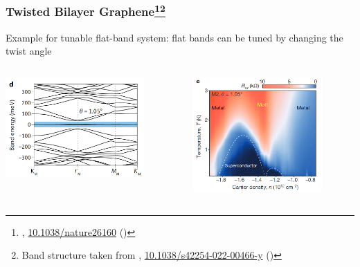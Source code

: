 \documentclass[aspectratio=169]{beamer}
\begin{document}
\begin{frame}
	\frametitle{Twisted Bilayer Graphene\footnote[frame]{\citeauthor{caoUnconventionalSuperconductivityMagicangle2018},  \href{https://doi.org/10.1038/nature26160}{10.1038/nature26160} (\citeyear{caoUnconventionalSuperconductivityMagicangle2018})}\footnote[frame]{Band structure taken from \citeauthor{tormaSuperconductivitySuperfluidityQuantum2022},  \href{https://doi.org/10.1038/s42254-022-00466-y}{10.1038/s42254-022-00466-y} (\citeyear{tormaSuperconductivitySuperfluidityQuantum2022})}}
	
	Example for tunable flat-band system: flat bands can be tuned by changing the twist angle
	
	\begin{columns}[T]
		\begin{column}{0.5\textwidth}
			\begin{center}
				\includegraphics[width=0.8\textwidth]{figs/TBG band structure}
			\end{center}
		\end{column}
		\begin{column}{0.5\textwidth}
			\begin{center}
				\includegraphics[width=0.8\textwidth]{figs/TBG SC experiment}
			\end{center}
		\end{column}
	\end{columns}
\end{frame}
\end{document}
